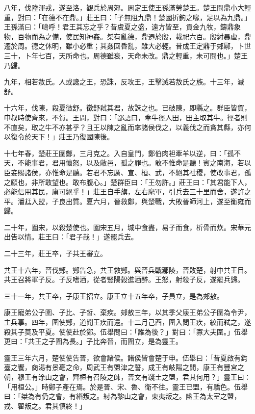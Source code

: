 \begin{pinyinscope}
八年，伐陸渾戎，遂至洛，觀兵於周郊。周定王使王孫滿勞楚王。楚王問鼎小大輕重，對曰：「在德不在鼎。」莊王曰：「子無阻九鼎！楚國折鉤之喙，足以為九鼎。」王孫滿曰：「嗚呼！君王其忘之乎？昔虞夏之盛，遠方皆至，貢金九牧，鑄鼎象物，百物而為之備，使民知神姦。桀有亂德，鼎遷於殷，載祀六百。殷紂暴虐，鼎遷於周。德之休明，雖小必重；其姦回昏亂，雖大必輕。昔成王定鼎于郟鄏，卜世三十，卜年七百，天所命也。周德雖衰，天命未改。鼎之輕重，未可問也。」楚王乃歸。

九年，相若敖氏。人或讒之王，恐誅，反攻王，王擊滅若敖氏之族。十三年，滅舒。

十六年，伐陳，殺夏徵舒。徵舒弒其君，故誅之也。已破陳，即縣之。群臣皆賀，申叔時使齊來，不賀。王問，對曰：「鄙語曰，牽牛徑人田，田主取其牛。徑者則不直矣，取之牛不亦甚乎？且王以陳之亂而率諸侯伐之，以義伐之而貪其縣，亦何以復令於天下！」莊王乃復國陳後。

十七年春，楚莊王圍鄭，三月克之。入自皇門，鄭伯肉袒牽羊以逆，曰：「孤不天，不能事君，君用懷怒，以及敝邑，孤之罪也。敢不惟命是聽！賓之南海，若以臣妾賜諸侯，亦惟命是聽。若君不忘厲、宣、桓、武，不絕其社稷，使改事君，孤之願也，非所敢望也。敢布腹心。」楚群臣曰：「王勿許。」莊王曰：「其君能下人，必能信用其民，庸可絕乎！」莊王自手旗，左右麾軍，引兵去三十里而舍，遂許之平。潘尪入盟，子良出質。夏六月，晉救鄭，與楚戰，大敗晉師河上，遂至衡雍而歸。

二十年，圍宋，以殺楚使也。圍宋五月，城中食盡，易子而食，析骨而炊。宋華元出告以情。莊王曰：「君子哉！」遂罷兵去。

二十三年，莊王卒，子共王審立。

共王十六年，晉伐鄭。鄭告急，共王救鄭。與晉兵戰鄢陵，晉敗楚，射中共王目。共王召將軍子反。子反嗜酒，從者豎陽穀進酒醉。王怒，射殺子反，遂罷兵歸。

三十一年，共王卒，子康王招立。康王立十五年卒，子員立，是為郟敖。

康王寵弟公子圍、子比、子皙、棄疾。郟敖三年，以其季父康王弟公子圍為令尹，主兵事。四年，圍使鄭，道聞王疾而還。十二月己酉，圍入問王疾，絞而弒之，遂殺其子莫及平夏。使使赴於鄭。伍舉問曰：「誰為後？」對曰：「寡大夫圍。」伍舉更曰：「共王之子圍為長。」子比奔晉，而圍立，是為靈王。

靈王三年六月，楚使使告晉，欲會諸侯。諸侯皆會楚于申。伍舉曰：「昔夏啟有鈞臺之饗，商湯有景亳之命，周武王有盟津之誓，成王有岐陽之閒，康王有豐宮之朝，穆王有涂山之會，齊桓有召陵之師，晉文有踐土之盟，君其何用？」靈王曰：「用桓公。」時鄭子產在焉。於是晉、宋、魯、衛不往。靈王已盟，有驕色。伍舉曰：「桀為有仍之會，有緡叛之。紂為黎山之會，東夷叛之。幽王為太室之盟，戎、翟叛之。君其慎終！」


\end{pinyinscope}
